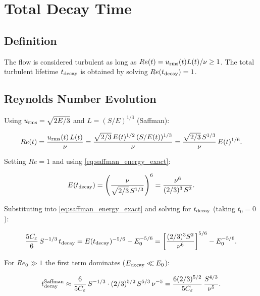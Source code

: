 \documentclass[12pt,a4paper]{article}
\newcommand{\Reu}{Re_{0}}
\newcommand{\Ceps}{C_{\varepsilon}}
\theoremstyle{plain}
\theoremstyle{definition}
\begin{document}
\section{Total Decay Time}
\label{sec:decay_time}

\subsection{Definition}

The flow is considered turbulent as long as $Re(t) = u_{\rm rms}(t)
L(t)/\nu \geq 1$. The total turbulent lifetime $t_{\rm decay}$ is
obtained by solving $Re(t_{\rm decay}) = 1$.

\subsection{Reynolds Number Evolution}

Using $u_{\rm rms} = \sqrt{2E/3}$ and $L = (S/E)^{1/3}$ (Saffman):

\begin{equation}
  Re(t) = \frac{u_{\rm rms}(t)\,L(t)}{\nu}
        = \frac{\sqrt{2/3}\,E(t)^{1/2}\,(S/E(t))^{1/3}}{\nu}
        = \frac{\sqrt{2/3}\,S^{1/3}}{\nu}\,E(t)^{1/6}.
  \label{eq:Re_saffman}
\end{equation}

Setting $Re = 1$ and using \cref{eq:saffman_energy_exact}:

\begin{equation}
  E(t_{\rm decay}) = \left(\frac{\nu}{\sqrt{2/3}\,S^{1/3}}\right)^6
                   = \frac{\nu^6}{(2/3)^3\,S^2}.
  \label{eq:E_at_decay_saffman}
\end{equation}

Substituting into \cref{eq:saffman_energy_exact} and solving for
$t_{\rm decay}$ (taking $t_0 = 0$):

\begin{equation}
  \frac{5\Ceps}{6}\,S^{-1/3}\,t_{\rm decay}
  = E(t_{\rm decay})^{-5/6} - E_0^{-5/6}
  = \left[\frac{(2/3)^3 S^2}{\nu^6}\right]^{5/6} - E_0^{-5/6}.
\end{equation}

For $\Reu \gg 1$ the first term dominates ($E_{\rm decay}\ll E_0$):

\begin{equation}
  t_{\rm decay}^{\rm Saffman} \approx \frac{6}{5\Ceps}\,S^{-1/3}
  \cdot (2/3)^{5/2}\,S^{5/3}\,\nu^{-5}
  = \frac{6(2/3)^{5/2}}{5\Ceps}\,\frac{S^{4/3}}{\nu^5}.
  \label{eq:tdecay_saffman_intermediate}
\end{equation}
\end{document}
